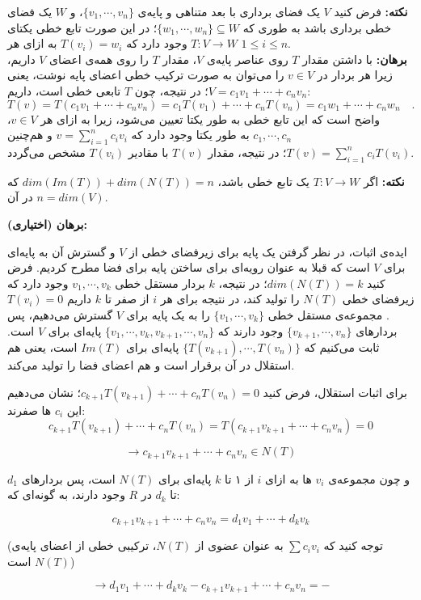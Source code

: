 \textbf{نکته:}
فرض کنید $V$ یک فضا‌ی برداری با بعد متناهی و پایه‌ی $\{v_1,\cdots,v_n\}$، و $W$ یک فضای خطی برداری باشد به طوری که $\{w_1,\cdots,w_n\}\subseteq W$؛ در این صورت تابع خطی یکتای $T:V\rightarrow W$ وجود دارد که $T(v_i)=w_i$ به ازای هر $1\leq i \leq n$.\\
\textbf{برهان:}
با داشتن مقدار $T$ روی عناصر پایه‌ی $V$، مقدار $T$ را روی همه‌ی اعضا‌ی $V$ داریم، زیرا هر بردار در $v\in V$ را می‌توان به صورت ترکیب خطی اعضا‌ی پایه نوشت، یعنی $V = c_1v_1+\cdots+c_nv_n$؛ در نتیجه، چون $T$ تابعی خطی است، داریم:
$$T(v) = T(c_1v_1+\cdots+c_nv_n) = c_1T(v_1)+\cdots+c_nT(v_n) = c_1w_1+\cdots+c_nw_n\quad .$$
واضح است که این تابع خطی به طور یکتا تعیین می‌شود، زیرا به ازای هر $v\in V$، $c_1,\cdots,c_n$ به طور یکتا وجود دارد که $v = \sum_{i=1}^nc_iv_i$ و هم‌چنین $T(v) =\sum_{i=1}^nc_iT(v_i) $؛ در نتیجه، مقدار $T(v)$ با مقادیر $T(v_i)$ مشخص می‌گردد.

\textbf{نکته:}
اگر $T:V\rightarrow W$ یک تابع خطی باشد، $dim(Im(T)) + dim(N(T)) = n$ که در آن $n=dim(V)$.

\textbf{برهان (اختیاری):}

ایده‌ی اثبات، در نظر گرفتن یک پایه برای زیرفضای خطی از $V$ و گسترش آن به پایه‌ای برای $V$ است که قبلا به عنوان رویه‌ای برای ساختن پایه برای فضا مطرح کردیم. فرض کنید $dim(N(T)) = k$؛ در نتیجه، $k$ بردار مستقل خطی $v_1,\cdots,v_k$ وجود دارد که زیرفضای خطی $N(T)$ را تولید کند، در نتیجه برای هر $i$ از صفر تا $k$ داریم $T(v_i)=0$. مجموعه‌ی مستقل خطی $\{v_1,\cdots,v_k\}$ را به یک پایه برای $V$ گسترش می‌دهیم، پس بردارهای $\{v_{k+1},\cdots,v_n\}$ وجود دارند که $\{v_1, \cdots, v_k, v_{k+1},\cdots,v_n\}$ پایه‌ای برای $V$ است. ثابت می‌کنیم که $\{T(v_{k+1}),\cdots,T(v_n)\}$ پایه‌ای برای $Im(T)$ است، یعنی هم استقلال در آن برقرار است و هم اعضای فضا را تولید می‌کند.

برای اثبات استقلال، فرض کنید $c_{k+1} T(v_{k+1}) + \cdots + c_n T(v_n) = 0$؛ نشان می‌دهیم این $c_i$ ها صفرند:
$$ c_{k+1} T(v_{k+1}) + \cdots + c_n T(v_n) = T(c_{k+1} v_{k+1} + \cdots + c_n v_n) = 0 $$

$$ \to c_{k+1} v_{k+1} + \cdots + c_n v_n \in N(T) $$

و چون مجموعه‌ی $v_i$ ها به ازای $i$ از ۱ تا $k$ پایه‌ای برای $N(T)$ است، پس بردارهای $d_1$ تا $d_k$ در $R$ وجود دارند، به گونه‌ای که:

$$ c_{k+1} v_{k+1} +\cdots +c_n v_n  = d_1 v_1 + \cdots + d_k v_k$$

(توجه کنید که $\sum{c_i v_i}$ به عنوان عضوی از $N(T)$، ترکیبی خطی از اعضای پایه‌ی $N(T)$ است)

$$ \to d_1 v_1 + \cdots + d_k v_k - c_{k+1} v_{k+1} +\cdots +c_n v_n = - $$

